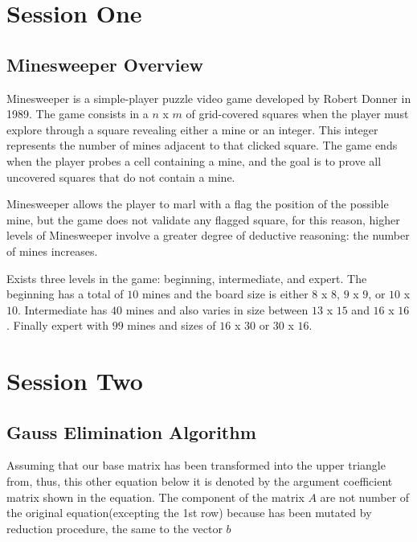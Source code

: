\documentclass[a4paper]{article}
\numberwithin{equation}{subsection}
\begin{document}
\section{Session One} \label{chap:1}

\subsection{Minesweeper Overview}
Minesweeper is a simple-player puzzle video game developed by Robert Donner in 1989. The game consists in a $n$ x $m$ of grid-covered squares when the player must explore through a square revealing  either a mine or an integer. This integer represents the number of mines adjacent to that clicked square. The game ends when the player probes a cell containing a mine, and the goal is to prove all uncovered squares that do not contain a mine. 


\vspace{5mm} %
Minesweeper allows the player to marl with a flag the position of the possible mine, but the game does not validate any flagged square, for this reason, higher levels of Minesweeper involve a greater degree of deductive reasoning: the number of mines increases. 


\vspace{5mm} %
Exists three levels in the game: beginning, intermediate, and expert. The beginning has a total of $10$ mines and the board size is either $8$ x $8$, $9$ x $9$, or $10$ x $10$. Intermediate has $40$ mines and also varies in size between $13$ x $15$ and $16$ x $16$. Finally expert with $99$ mines and sizes of $16$ x $30$ or $30$ x $16$.
\section{Session Two } \label{chap:2}
\subsection{Gauss Elimination Algorithm}
Assuming that our base matrix has been transformed into the upper triangle from, thus, this other equation below it is denoted by the argument coefficient matrix shown in the equation. The component of the matrix $A$ are not number of the original equation(excepting the 1st row) because has been mutated by reduction procedure, the same to the vector $b$
\end{document}
